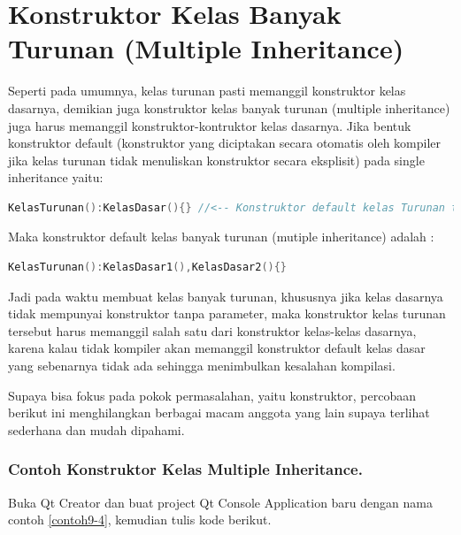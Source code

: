 \section{Konstruktor Kelas Banyak Turunan (Multiple Inheritance)}\label{konstruktor-kelas-banyak-turunan-multiple-inheritance}

Seperti pada umumnya, kelas turunan pasti memanggil konstruktor kelas
dasarnya, demikian juga konstruktor kelas banyak turunan (multiple
inheritance) juga harus memanggil konstruktor-kontruktor kelas dasarnya.
Jika bentuk konstruktor default (konstruktor yang diciptakan secara
otomatis oleh kompiler jika kelas turunan tidak menuliskan konstruktor
secara eksplisit) pada single inheritance yaitu:

\begin{lstlisting}[language=c++, numbers=none]
KelasTurunan():KelasDasar(){} //<-- Konstruktor default kelas Turunan tunggal
\end{lstlisting}

Maka konstruktor default kelas banyak turunan (mutiple inheritance)
adalah :

\begin{lstlisting}[language=c++, numbers=none]
KelasTurunan():KelasDasar1(),KelasDasar2(){}
\end{lstlisting}

Jadi pada waktu membuat kelas banyak turunan, khususnya jika kelas
dasarnya tidak mempunyai konstruktor tanpa parameter, maka konstruktor
kelas turunan tersebut harus memanggil salah satu dari konstruktor
kelas-kelas dasarnya, karena kalau tidak kompiler akan memanggil
konstruktor default kelas dasar yang sebenarnya tidak ada sehingga
menimbulkan kesalahan kompilasi.

Supaya bisa fokus pada pokok permasalahan, yaitu konstruktor, percobaan
berikut ini menghilangkan berbagai macam anggota yang lain supaya
terlihat sederhana dan mudah dipahami.

\subsubsection*{Contoh  Konstruktor Kelas Multiple Inheritance.}

Buka Qt Creator dan buat project Qt Console Application baru dengan nama
contoh \ref{contoh9-4}, kemudian tulis kode berikut.




